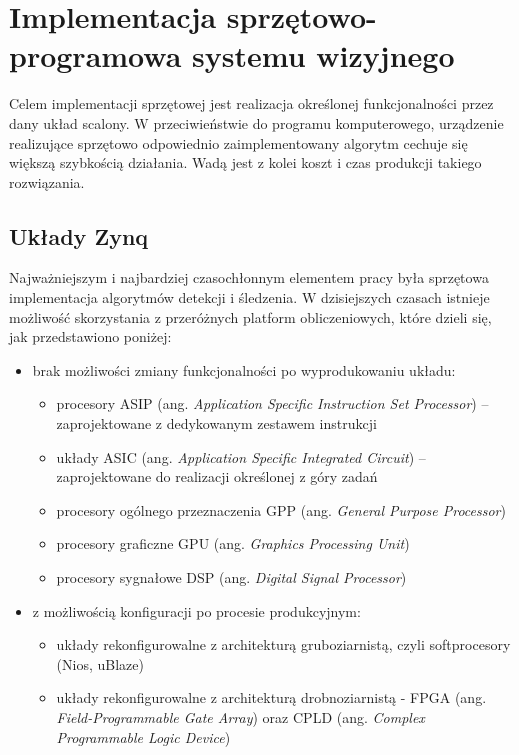 \chapter{Implementacja sprzętowo-programowa systemu wizyjnego}

Celem implementacji sprzętowej jest realizacja określonej funkcjonalności przez dany układ scalony. W przeciwieństwie do programu komputerowego, urządzenie realizujące sprzętowo odpowiednio zaimplementowany algorytm cechuje się większą szybkością działania. Wadą jest z kolei koszt i czas produkcji takiego rozwiązania.

\section{Układy Zynq}

Najważniejszym i najbardziej czasochłonnym elementem pracy była sprzętowa implementacja algorytmów detekcji i śledzenia. %
W dzisiejszych czasach istnieje możliwość skorzystania z przeróżnych platform obliczeniowych, które dzieli się, jak przedstawiono poniżej:
\begin{itemize}
	\item brak możliwości zmiany funkcjonalności po wyprodukowaniu układu:
	\begin{itemize}
		\item procesory ASIP (ang. \textit{Application Specific Instruction Set Processor}) -- zaprojektowane z dedykowanym zestawem instrukcji		
		\item układy ASIC (ang. \textit{Application Specific Integrated Circuit}) -- zaprojektowane do realizacji określonej z góry zadań
		\item procesory ogólnego przeznaczenia GPP (ang. \textit{General Purpose Processor}) %
		\item procesory graficzne GPU (ang. \textit{Graphics Processing Unit})
		\item procesory sygnałowe DSP (ang. \textit{Digital Signal Processor})
	\end{itemize}
	\item z możliwością konfiguracji po procesie produkcyjnym:
	\begin{itemize} 
		\item układy rekonfigurowalne z architekturą gruboziarnistą,  czyli softprocesory (Nios, uBlaze)%
		\item układy rekonfigurowalne z architekturą drobnoziarnistą - FPGA (ang. \textit{Field-Programmable Gate Array}) oraz CPLD (ang. \textit{Complex Programmable Logic Device})
	\end{itemize}
\end{itemize}

